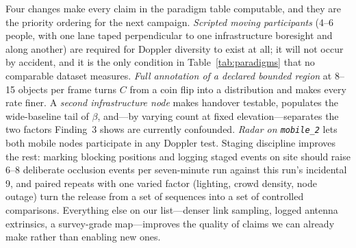 Four changes make every claim in the paradigm table computable, and they are
the priority ordering for the next campaign. \emph{Scripted moving
participants} (4--6 people, with one lane taped perpendicular to one
infrastructure boresight and along another) are required for Doppler diversity
to exist at all; it will not occur by accident, and it is the only condition in
Table~\ref{tab:paradigms} that no comparable dataset measures. \emph{Full
annotation of a declared bounded region} at 8--15 objects per frame turns $C$
from a coin flip into a distribution and makes every rate finer. A \emph{second
infrastructure node} makes handover testable, populates the wide-baseline tail
of $\beta$, and---by varying count at fixed elevation---separates the two
factors Finding~3 shows are currently confounded. \emph{Radar on
\texttt{mobile\_2}} lets both mobile nodes participate in any Doppler test.
Staging discipline improves the rest: marking blocking positions and logging
staged events on site should raise 6--8 deliberate occlusion events per
seven-minute run against this run's incidental 9, and paired repeats with one
varied factor (lighting, crowd density, node outage) turn the release from a
set of sequences into a set of controlled comparisons. Everything else on our
list---denser link sampling, logged antenna extrinsics, a survey-grade
map---improves the quality of claims we can already make rather than enabling
new ones.
